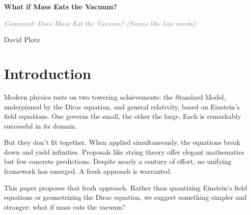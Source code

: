 \documentclass {article}
\newcommand{\comment}[1]{\textcolor{gray}{\small\textit{Comment: #1}}}
\begin{document}
	\thispagestyle{empty}%

	
\begin{center}\strut
	\bfseries\Huge
	What if  Mass Eats the Vacuum? 

\end{center}

	\comment{Does Mass Eat the Vacuum? (Seems like less words)}

\centerline{David Plotz}


\begin{center}\strut
	\date{\today}
\end{center}
\vfill

	
\newpage
\begin{abstract}
	This paper introduces a classical field theory of gravity built on the Maxwell equations and a central physical hypothesis: that mass absorbs zero-point radiation, inducing a net inward momentum flow. Drawing from stochastic electrodynamics (SED), we assume a Lorentz-invariant radiation field present throughout space and hypothesize that mass acts as a sink for this field.  We construct a consistent model of a massive particle, demonstrate energy and momentum conservation, and show that classical tests of general relativity, inlcuding Mercury's precession, gravitational lensing, and gravitational redshift, are reproduced to leading order. This approach provides a novel, Lorentz-invariant, classical alternative to general relativity, and lays a foundation for further exploration.
\end{abstract}
\newpage

\section{Introduction}

 Modern physics rests on two towering achievements: the Standard Model, underpinned by the Dirac equation, and general relativity, based on Einstein’s field equations. One governs the small, the other the large. Each is remarkably successful in its domain.

But they don’t fit together. When applied simultaneously, the equations break down and yield infinities.  Proposals like string theory offer elegant mathematics but few concrete predictions. Despite nearly a century of effort, no unifying framework has emerged. A fresh approach is warranted.

This paper proposes that fresh approach. Rather than quantizing Einstein’s field equations or geometrizing the Dirac equation, we suggest something simpler and stranger: what if mass eats the vacuum?
\end{document}
